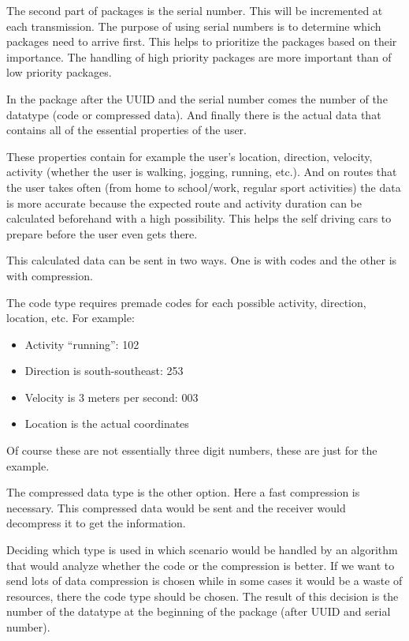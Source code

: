 \documentclass[conference]{IEEEtran}
\begin{document}
The second part of packages is the serial number. This will be incremented at each transmission. The purpose of using serial numbers is to determine which packages need to arrive first. This helps to prioritize the packages based on their importance. The handling of high priority packages are more important than of low priority packages.

In the package after the UUID and the serial number comes the number of the datatype (code or compressed data). And finally there is the actual data that contains all of the essential properties of the user.

These properties contain for example the user’s location, direction, velocity, activity (whether the user is walking, jogging, running, etc.). And on routes that the user takes often (from home to school/work, regular sport activities) the data is more accurate because the expected route and activity duration can be calculated beforehand with a high possibility. This helps the self driving cars to prepare before the user even gets there.

This calculated data can be sent in two ways. One is with codes and the other is with compression.

The code type requires premade codes for each possible activity, direction, location, etc.
For example:

\begin{itemize}
    \item Activity “running”: 102
    \item Direction is south-southeast: 253
    \item Velocity is 3 meters per second: 003
    \item Location is the actual coordinates
\end{itemize}

Of course these are not essentially three digit numbers, these are just for the example.

The compressed data type is the other option. Here a fast compression is necessary. This compressed data would be sent and the receiver would decompress it to get the information.

Deciding which type is used in which scenario would be handled by an algorithm that would analyze whether the code or the compression is better. If we want to send lots of data compression is chosen while in some cases it would be a waste of resources, there the code type should be chosen. The result of this decision is the number of the datatype at the beginning of the package (after UUID and serial number).
\end{document}
